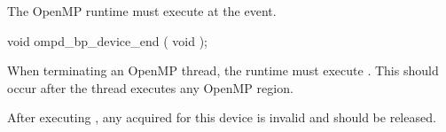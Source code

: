 \summary
The OpenMP runtime must execute 
 at the  event.


\format
\begin{cspecific}
\begin{ompSyntax}
void ompd_bp_device_end ( void );
\end{ompSyntax}
\end{cspecific}


\descr

When terminating an OpenMP thread, the runtime must 
execute .
This should occur after the thread executes any OpenMP region.

After 
executing , any  acquired for this
device is invalid and should be released.

